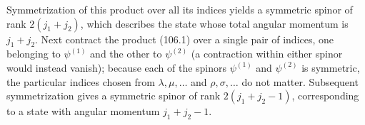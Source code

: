 Symmetrization of this product over all its indices yields a symmetric spinor of rank $2(j_1+j_2)$, which describes the state whose total angular momentum is $j_1+j_2$.
Next contract the product (106.1) over a single pair of indices, one belonging to $\psi^{(1)}$ and the other to $\psi^{(2)}$ (a contraction within either spinor would instead vanish); because each of the spinors $\psi^{(1)}$ and $\psi^{(2)}$ is symmetric, the particular indices chosen from $\lambda,\mu,\ldots$ and $\rho,\sigma,\ldots$ do not matter.
Subsequent symmetrization gives a symmetric spinor of rank $2(j_1+j_2-1)$, corresponding to a state with angular momentum $j_1+j_2-1$\footnotemark.
\footnotetext{}
